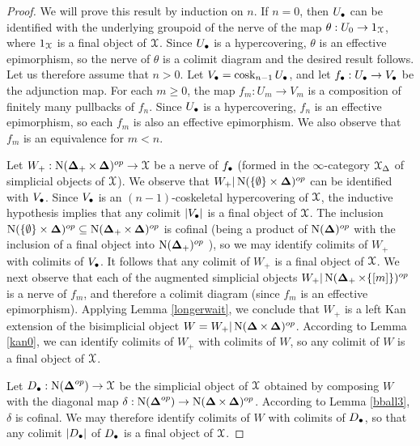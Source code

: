 \begin{proof}
We will prove this result by induction on $n$. If $n=0$, then $U_{\bullet}$ can be identified with the underlying groupoid of the \Cech nerve of the map $\theta: U_0 \rightarrow 1_{\operatorname{\mathcal{X}}}$, where $1_{\operatorname{\mathcal{X}}}$ is a final object of $\operatorname{\mathcal{X}}$. Since $U_{\bullet}$ is a hypercovering, $\theta$ is an effective epimorphism, so the \Cech nerve of $\theta$ is a colimit diagram and the desired result follows. Let us therefore assume that $n > 0$. Let $V_{\bullet} = \operatorname{cosk}_{n-1} U_{\bullet}$, and let
$f_{\bullet}: U_{\bullet} \rightarrow V_{\bullet}$ be the adjunction map. 
For each $m \geq 0$, the map $f_{m}: U_{m} \rightarrow V_{m}$ is a composition of finitely many pullbacks of $f_{n}$. Since $U_{\bullet}$ is a hypercovering, $f_n$ is an effective epimorphism, so each $f_m$ is also an effective epimorphism. We also observe that $f_m$ is an equivalence for $m < n$.

Let $W_{+}: \operatorname{N} (\operatorname{{\bf \Delta}}_{+} \times \operatorname{{\bf \Delta}})^{op} \rightarrow \operatorname{\mathcal{X}}$
be a \Cech nerve of $f_{\bullet}$ (formed in the $\infty$-category $\operatorname{\mathcal{X}}_{\Delta}$ of simplicial objects of $\operatorname{\mathcal{X}}$). We observe that
$W_{+} | \operatorname{N} ( \{ \emptyset \} \times \operatorname{{\bf \Delta}})^{op}$ can be identified with
$V_{\bullet}$. Since $V_{\bullet}$
is an $(n-1)$-coskeletal hypercovering of $\operatorname{\mathcal{X}}$, the inductive hypothesis implies that any colimit $|V_{\bullet}|$ is a final object of $\operatorname{\mathcal{X}}$. The inclusion $\operatorname{N} ( \{ \emptyset \} \times \operatorname{{\bf \Delta}})^{op}
\subseteq \operatorname{N}( \operatorname{{\bf \Delta}}_{+} \times \operatorname{{\bf \Delta}})^{op}$ is cofinal (being a product
of $\operatorname{N}(\operatorname{{\bf \Delta}})^{op}$ with the inclusion of a final object into $\operatorname{N}(\operatorname{{\bf \Delta}}_{+})^{op}$ ), so
we may identify colimits of $W_{+}$ with colimits of $V_{\bullet}$. It follows that
any colimit of $W_{+}$ is a final object of $\operatorname{\mathcal{X}}$.
We next observe that each of the augmented simplicial objects
$W_{+}| \operatorname{N}( \operatorname{{\bf \Delta}}_{+} \times \{ [m] \})^{op}$ is a \Cech nerve of $f_{m}$, and therefore a colimit diagram (since $f_m$ is an effective epimorphism). Applying Lemma \ref{longerwait}, we conclude that $W_{+}$ is a left Kan extension of the bisimplicial object
$W = W_{+}| \operatorname{N}( \operatorname{{\bf \Delta}} \times \operatorname{{\bf \Delta}})^{op}$. According to Lemma \ref{kan0}, we can
identify colimits of $W_{+}$ with colimits of $W$, so any colimit of $W$ is a final object of $\operatorname{\mathcal{X}}$.

Let $D_{\bullet}: \operatorname{N}(\operatorname{{\bf \Delta}}^{op}) \rightarrow \operatorname{\mathcal{X}}$ be the simplicial object of $\operatorname{\mathcal{X}}$
obtained by composing $W$ with the diagonal map $\delta: \operatorname{N}(\operatorname{{\bf \Delta}}^{op}) \rightarrow \operatorname{N} (\operatorname{{\bf \Delta}} \times \operatorname{{\bf \Delta}})^{op}$. According to Lemma \ref{bball3}, $\delta$ is cofinal.
We may therefore identify colimits of $W$ with colimits of $D_{\bullet}$, so that
any colimit $|D_{\bullet}|$ of $D_{\bullet}$ is a final object of $\operatorname{\mathcal{X}}$.


\end{proof}
